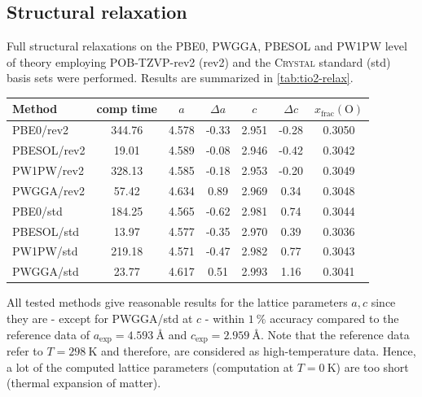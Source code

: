 \documentclass[a4paper,12pt,parskip=half]{scrartcl}
\begin{document}
\subsection{Structural relaxation}
%
Full structural relaxations on the PBE0, PWGGA, PBESOL\autocite[]{pbesol} and PW1PW level of theory employing POB-TZVP-rev2 (rev2) and the \textsc{Crystal} standard (std) basis sets were performed. Results are summarized in \autoref{tab:tio2-relax}.
%
\begin{table}[H]
	\centering
	\label{tab:tio2-relax}
	\begin{tabular}{lcccccc}
		\toprule
		Method      & comp time & $a$   & $\Delta a $ & $c$   & $\Delta c$ & $x_\mathrm{frac} \mathrm{(O)}$ \\
		\midrule
		PBE0/rev2   & 344.76    & 4.578 & -0.33       & 2.951 & -0.28      & 0.3050                         \\
		PBESOL/rev2 & 19.01     & 4.589 & -0.08       & 2.946 & -0.42      & 0.3042                         \\
		PW1PW/rev2  & 328.13    & 4.585 & -0.18       & 2.953 & -0.20      & 0.3049                         \\
		PWGGA/rev2  & 57.42     & 4.634 & 0.89        & 2.969 & 0.34       & 0.3048                         \\
		PBE0/std    & 184.25    & 4.565 & -0.62       & 2.981 & 0.74       & 0.3044                         \\
		PBESOL/std  & 13.97     & 4.577 & -0.35       & 2.970 & 0.39       & 0.3036                         \\
		PW1PW/std   & 219.18    & 4.571 & -0.47       & 2.982 & 0.77       & 0.3043                         \\
		PWGGA/std   & 23.77     & 4.617 & 0.51        & 2.993 & 1.16       & 0.3041                         \\
		\bottomrule
	\end{tabular}
\end{table}
%
All tested methods give reasonable results for the lattice parameters $ a, c $ since they are - except for PWGGA/std at $ c $ - within $ \SI{1}{\percent} $ accuracy compared to the reference data of $ a_\mathrm{exp} = \SI{4.593}{\angstrom} $ and $ c_\mathrm{exp} = \SI{2.959}{\angstrom} $. Note that the reference data refer to $ T = \SI{298}{\kelvin} $ and therefore, are considered as high-temperature data. Hence, a lot of the computed lattice parameters (computation at $ T = \SI{0}{\kelvin} $) are too short (thermal expansion of matter).
\end{document}
